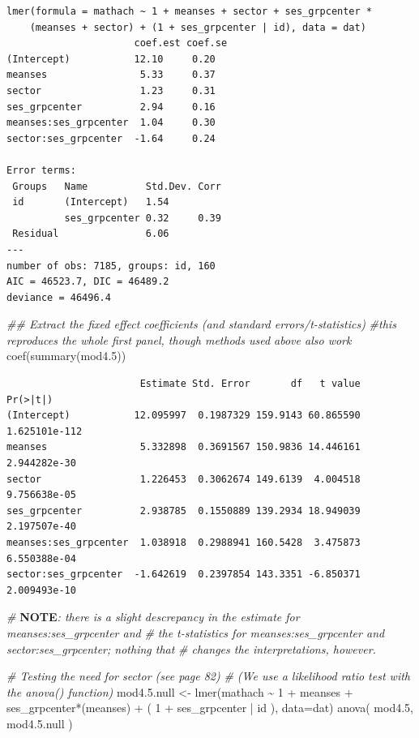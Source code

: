 \documentclass[
  letterpaper,
  DIV=11,
  numbers=noendperiod]{scrreprt}
\newenvironment{Shaded}{}{}
\newcommand{\AlertTok}[1]{\textcolor[rgb]{1.00,0.00,0.00}{\textbf{#1}}}
\newcommand{\AttributeTok}[1]{\textcolor[rgb]{0.49,0.56,0.16}{#1}}
\newcommand{\CommentTok}[1]{\textcolor[rgb]{0.38,0.63,0.69}{\textit{#1}}}
\newcommand{\DecValTok}[1]{\textcolor[rgb]{0.25,0.63,0.44}{#1}}
\newcommand{\DocumentationTok}[1]{\textcolor[rgb]{0.73,0.13,0.13}{\textit{#1}}}
\newcommand{\FloatTok}[1]{\textcolor[rgb]{0.25,0.63,0.44}{#1}}
\newcommand{\FunctionTok}[1]{\textcolor[rgb]{0.02,0.16,0.49}{#1}}
\newcommand{\NormalTok}[1]{#1}
\newcommand{\OtherTok}[1]{\textcolor[rgb]{0.00,0.44,0.13}{#1}}
\newcommand{\SpecialCharTok}[1]{\textcolor[rgb]{0.25,0.44,0.63}{#1}}
\begin{document}
\begin{verbatim}
lmer(formula = mathach ~ 1 + meanses + sector + ses_grpcenter * 
    (meanses + sector) + (1 + ses_grpcenter | id), data = dat)
                      coef.est coef.se
(Intercept)           12.10     0.20  
meanses                5.33     0.37  
sector                 1.23     0.31  
ses_grpcenter          2.94     0.16  
meanses:ses_grpcenter  1.04     0.30  
sector:ses_grpcenter  -1.64     0.24  

Error terms:
 Groups   Name          Std.Dev. Corr 
 id       (Intercept)   1.54          
          ses_grpcenter 0.32     0.39 
 Residual               6.06          
---
number of obs: 7185, groups: id, 160
AIC = 46523.7, DIC = 46489.2
deviance = 46496.4 
\end{verbatim}

\begin{Shaded}
\begin{Highlighting}[]
\DocumentationTok{\#\# Extract the fixed effect coefficients (and standard errors/t{-}statistics)}
\CommentTok{\#this reproduces the whole first panel, though methods used above also work}
\FunctionTok{coef}\NormalTok{(}\FunctionTok{summary}\NormalTok{(mod4}\FloatTok{.5}\NormalTok{))}
\end{Highlighting}
\end{Shaded}

\begin{verbatim}
                       Estimate Std. Error       df   t value      Pr(>|t|)
(Intercept)           12.095997  0.1987329 159.9143 60.865590 1.625101e-112
meanses                5.332898  0.3691567 150.9836 14.446161  2.944282e-30
sector                 1.226453  0.3062674 149.6139  4.004518  9.756638e-05
ses_grpcenter          2.938785  0.1550889 139.2934 18.949039  2.197507e-40
meanses:ses_grpcenter  1.038918  0.2988941 160.5428  3.475873  6.550388e-04
sector:ses_grpcenter  -1.642619  0.2397854 143.3351 -6.850371  2.009493e-10
\end{verbatim}

\begin{Shaded}
\begin{Highlighting}[]
\CommentTok{\# }\AlertTok{NOTE}\CommentTok{: there is a slight descrepancy in the estimate for meanses:ses\_grpcenter and }
\CommentTok{\# the t{-}statistics for meanses:ses\_grpcenter and sector:ses\_grpcenter; nothing that }
\CommentTok{\# changes the interpretations, however.}


\CommentTok{\# Testing the need for sector  (see page 82)}
\CommentTok{\# (We use a likelihood ratio test with the anova() function)}
\NormalTok{mod4.}\FloatTok{5.}\NormalTok{null }\OtherTok{\textless{}{-}} \FunctionTok{lmer}\NormalTok{(mathach }\SpecialCharTok{\textasciitilde{}} \DecValTok{1} \SpecialCharTok{+}\NormalTok{ meanses }\SpecialCharTok{+}\NormalTok{ ses\_grpcenter}\SpecialCharTok{*}\NormalTok{(meanses) }\SpecialCharTok{+}\NormalTok{ ( }\DecValTok{1} \SpecialCharTok{+}\NormalTok{ ses\_grpcenter }\SpecialCharTok{|}\NormalTok{ id ), }\AttributeTok{data=}\NormalTok{dat)}
\FunctionTok{anova}\NormalTok{( mod4}\FloatTok{.5}\NormalTok{, mod4.}\FloatTok{5.}\NormalTok{null )}
\end{Highlighting}
\end{Shaded}
\end{document}
